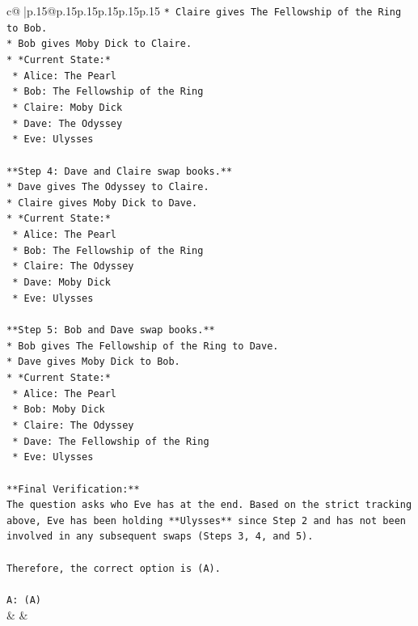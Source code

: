 \documentclass{article}
\begin{document}
{\begin{supertabular}{c@{$\;$}|p{.15\linewidth}@{}p{.15\linewidth}p{.15\linewidth}p{.15\linewidth}p{.15\linewidth}p{.15\linewidth}}
{{{\texttt{*   Claire gives The Fellowship of the Ring to Bob.} \\
\texttt{*   Bob gives Moby Dick to Claire.} \\
\texttt{*   *Current State:*} \\
\texttt{    *   Alice: The Pearl} \\
\texttt{    *   Bob: The Fellowship of the Ring} \\
\texttt{    *   Claire: Moby Dick} \\
\texttt{    *   Dave: The Odyssey} \\
\texttt{    *   Eve: Ulysses} \\
\\ 
\texttt{**Step 4: Dave and Claire swap books.**} \\
\texttt{*   Dave gives The Odyssey to Claire.} \\
\texttt{*   Claire gives Moby Dick to Dave.} \\
\texttt{*   *Current State:*} \\
\texttt{    *   Alice: The Pearl} \\
\texttt{    *   Bob: The Fellowship of the Ring} \\
\texttt{    *   Claire: The Odyssey} \\
\texttt{    *   Dave: Moby Dick} \\
\texttt{    *   Eve: Ulysses} \\
\\ 
\texttt{**Step 5: Bob and Dave swap books.**} \\
\texttt{*   Bob gives The Fellowship of the Ring to Dave.} \\
\texttt{*   Dave gives Moby Dick to Bob.} \\
\texttt{*   *Current State:*} \\
\texttt{    *   Alice: The Pearl} \\
\texttt{    *   Bob: Moby Dick} \\
\texttt{    *   Claire: The Odyssey} \\
\texttt{    *   Dave: The Fellowship of the Ring} \\
\texttt{    *   Eve: Ulysses} \\
\\ 
\texttt{**Final Verification:**} \\
\texttt{The question asks who Eve has at the end. Based on the strict tracking above, Eve has been holding **Ulysses** since Step 2 and has not been involved in any subsequent swaps (Steps 3, 4, and 5).} \\
\\ 
\texttt{Therefore, the correct option is (A).} \\
\\ 
\texttt{A: (A)} \\
            }
        }
    }
    & & \\ \\


\end{supertabular}}
\end{document}
